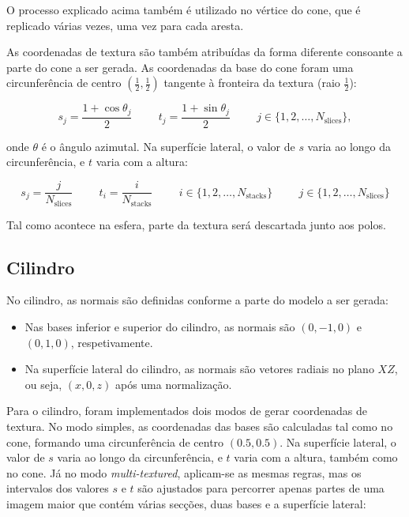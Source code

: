 \documentclass[12pt, a4paper]{article}
\begin{document}
O processo explicado acima também é utilizado no vértice do cone, que é replicado várias vezes, uma
vez para cada aresta.

As coordenadas de textura são também atribuídas da forma diferente consoante a parte do cone a ser
gerada. As coordenadas da base do cone foram uma circunferência de centro
$(\frac{1}{2}, \frac{1}{2})$ tangente à fronteira da textura (raio $\frac{1}{2}$):

$$
s_j = \frac{1 + \cos \theta_j}{2}
\hspace{1cm}
t_j = \frac{1 + \sin \theta_j}{2}
\hspace{1cm}
j \in \lbrace 1, 2, \ldots, N_\text{slices} \rbrace,
$$

onde $\theta$ é o ângulo azimutal. Na superfície lateral, o valor de $s$ varia ao longo da
circunferência, e $t$ varia com a altura:

$$
s_j = \frac{j}{N_\text{slices}}
\hspace{1cm}
t_i = \frac{i}{N_\text{stacks}}
\hspace{1cm}
i \in \lbrace 1, 2, \ldots, N_\text{stacks} \rbrace
\hspace{1cm}
j \in \lbrace 1, 2, \ldots, N_\text{slices} \rbrace
$$

Tal como acontece na esfera, parte da textura será descartada junto aos polos.

\subsection{Cilindro}

No cilindro, as normais são definidas conforme a parte do modelo a ser gerada:

\begin{itemize}
    \item Nas bases inferior e superior do cilindro, as normais são $(0, -1, 0)$ e $(0, 1, 0)$,
        respetivamente.

    \item Na superfície lateral do cilindro, as normais são vetores radiais no plano $XZ$, ou seja,
        $(x, 0, z)$ após uma normalização.
\end{itemize}

Para o cilindro, foram implementados dois modos de gerar coordenadas de textura. No modo simples, as
coordenadas das bases são calculadas tal como no cone, formando uma circunferência de centro
$(0.5, 0.5)$. Na superfície lateral, o valor de $s$ varia ao longo da circunferência, e $t$ varia
com a altura, também como no cone. Já no modo \emph{multi-textured}, aplicam-se as mesmas regras,
mas os intervalos dos valores $s$ e $t$ são ajustados para percorrer apenas partes de uma imagem
maior que contém várias secções, duas bases e a superfície lateral:
\end{document}
